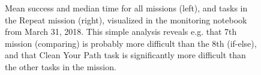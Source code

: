 \begin{figure}[htb]
\begin{subfigure}{.51\textwidth}
\end{subfigure}
\caption{%
  Mean success and median time for all missions (left),
  and tasks in the Repeat mission (right),
  visualized in the monitoring notebook
  from March 31, 2018. This simple analysis reveals e.g.
  that 7th mission (comparing) is probably more difficult than the 8th (if-else),
  and that Clean Your Path task is significantly more difficult than
  the other tasks in the mission.}
\label{fig:monitoring-notebook}
\end{figure}









